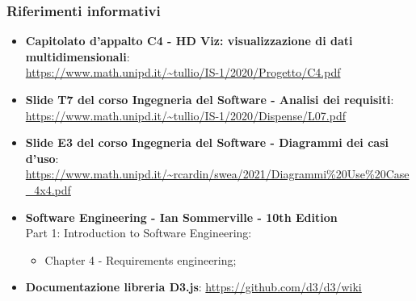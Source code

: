 \subsubsection{Riferimenti informativi}
\begin{itemize}
	\item \textbf{Capitolato d'appalto C4 - HD Viz: visualizzazione di dati multidimensionali}:\\
	\textcolor{blue}{\url{https://www.math.unipd.it/~tullio/IS-1/2020/Progetto/C4.pdf}}
	
	\item \textbf{Slide T7 del corso Ingegneria del Software - Analisi dei requisiti}:\\
	\textcolor{blue}{\url{https://www.math.unipd.it/~tullio/IS-1/2020/Dispense/L07.pdf}}
	\item \textbf{Slide E3 del corso Ingegneria del Software - Diagrammi dei casi d'uso}:\\
	\textcolor{blue}{\url{https://www.math.unipd.it/~rcardin/swea/2021/Diagrammi\%20Use\%20Case_4x4.pdf}}

\item \textbf{Software Engineering - Ian Sommerville - 10th Edition}\\ Part 1: Introduction to Software Engineering:
	\begin{itemize}
	\item Chapter 4 - Requirements engineering;
	\end{itemize}
\item \textbf{Documentazione libreria D3.js}: 
	\textcolor{blue}{\url{https://github.com/d3/d3/wiki}}

\end{itemize}
	
	

